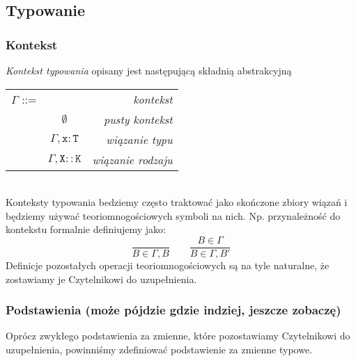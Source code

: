 \documentclass[11pt,leqno]{article}
\begin{document}
\subsection{Typowanie}

\subsubsection{Kontekst}

\emph{Kontekst typowania} opisany jest następującą składnią abstrakcyjną \\

\begin{tabular}{ | l c r | }
	\hline
	$\mathtt{\Gamma}$ ::= & & \textit{kontekst}\\
	& $\mathtt{\emptyset}$ & \textit{pusty kontekst} \\
	& $\mathtt{\Gamma,x:T}$& \textit{wiązanie typu} \\ 
	& $\mathtt{\Gamma,X::K}$& \textit{wiązanie rodzaju} \\ 
	\hline
\end{tabular} \\
	
Konteksty typowania bedziemy często traktować jako skończone zbiory wiązań i będziemy
używać teoriomnogościowych symboli na nich. Np. przynależność do kontekstu formalnie
definiujemy jako:
\[
	\frac{}{B \in \Gamma,B}
	\qquad
	\frac{B \in \Gamma}{B \in \Gamma,B'}
\]
Definicje pozostałych operacji teoriomnogościowych są na tyle naturalne, że zostawiamy
je Czytelnikowi do uzupełnienia.


\subsubsection{Podstawienia (może pójdzie gdzie indziej, jeszcze zobaczę)}
Oprócz zwykłego podstawienia za zmienne, które pozostawiamy Czytelnikowi do uzupełnienia, powinniśmy zdefiniować podstawienie za zmienne typowe.
\end{document}
